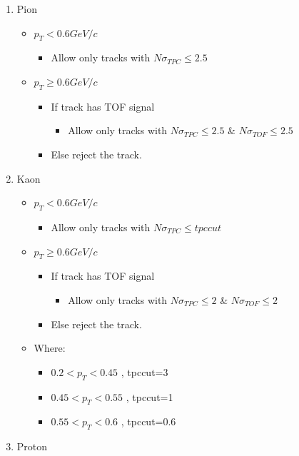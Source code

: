 \documentclass[ALICE,manyauthors]{ALICE_analysis_notes}
\begin{document}
\begin{enumerate}
	\item Pion
	\begin{itemize}[label=@]
		\item $p_T<0.6GeV/c$
		\begin{itemize}[label=$\bullet$]
			\item Allow only tracks with $N\sigma_{TPC} \leq 2.5$
		\end{itemize}
		\item $p_T\geq 0.6GeV/c$
		\begin{itemize}[label=$\bullet$]
			\item If track has TOF signal
			\begin{itemize}[label=$\star$]
				\item Allow  only tracks with $N\sigma_{TPC} \leq 2.5$ \& $N\sigma_{TOF}\leq 2.5$
			\end{itemize}
			\item Else reject the track.
		\end{itemize}
	\end{itemize}
	\item Kaon
	\begin{itemize}[label=@]
		\item $p_T<0.6GeV/c$
		\begin{itemize}[label=$\bullet$]
			\item Allow only tracks with $N\sigma_{TPC} \leq tpccut$
		\end{itemize}
		\item $p_T\geq 0.6GeV/c$
		\begin{itemize}[label=$\bullet$]
			\item If track has TOF signal
			\begin{itemize}[label=$\star$]
				\item Allow  only tracks with $N\sigma_{TPC} \leq 2$ \& $N\sigma_{TOF}\leq 2$
			\end{itemize}
			\item Else reject the track.
		\end{itemize}
		\item Where:
		\begin{itemize}[label=]
			\item $0.2<p_T<0.45$ , tpccut=3
			\item $0.45<p_T<0.55$ , tpccut=1
			\item $0.55<p_T<0.6$ , tpccut=0.6
		\end{itemize}
	\end{itemize}
	\item Proton

\end{enumerate}
\end{document}
